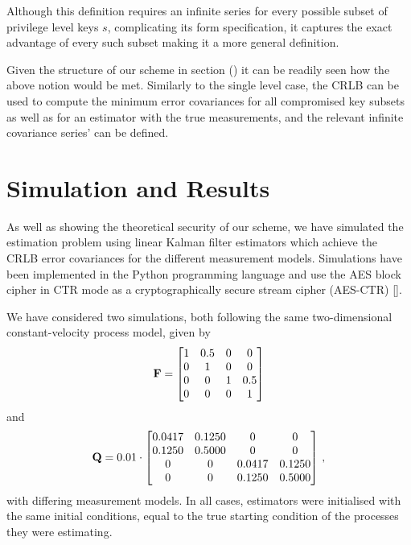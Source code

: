 \documentclass[letterpaper, 10 pt, conference]{IEEEtran}
\theoremstyle{definition}
\theoremstyle{definition}
\theoremstyle{remark}
\begin{document}
Although this definition requires an infinite series for every possible subset of privilege level keys $s$, complicating its form specification, it captures the exact advantage of every such subset making it a more general definition.

Given the structure of our scheme in section () it can be readily seen how the above notion would be met. Similarly to the single level case, the CRLB can be used to compute the minimum error covariances for all compromised key subsets as well as for an estimator with the true measurements, and the relevant infinite covariance series' can be defined.

% 
%                                 
%                                 
%                                 
% 

\section{Simulation and Results}\label{sec:simulation}
As well as showing the theoretical security of our scheme, we have simulated the estimation problem using linear Kalman filter estimators which achieve the CRLB error covariances for the different measurement models. Simulations have been implemented in the Python programming language and use the AES block cipher in CTR mode as a cryptographically secure stream cipher (AES-CTR) [].

We have considered two simulations, both following the same two-dimensional constant-velocity process model, given by
\begin{equation*}
   {\ensuremath{{\mathbf{F}}}}=
   \begin{bmatrix}
      1 & 0.5 & 0 & 0\\
      0 & 1 & 0 & 0\\
      0 & 0 & 1 & 0.5\\
      0 & 0 & 0 & 1
   \end{bmatrix}
\end{equation*}
and
\begin{equation*}
   {\ensuremath{{\mathbf{Q}}}}=0.01\cdot
   \begin{bmatrix}
      0.0417 & 0.1250 & 0 & 0\\
      0.1250 & 0.5000 & 0 & 0\\
      0 & 0 & 0.0417 & 0.1250\\
      0 & 0 & 0.1250 & 0.5000
   \end{bmatrix}\,,
\end{equation*}
with differing measurement models. In all cases, estimators were initialised with the same initial conditions, equal to the true starting condition of the processes they were estimating.
\end{document}

